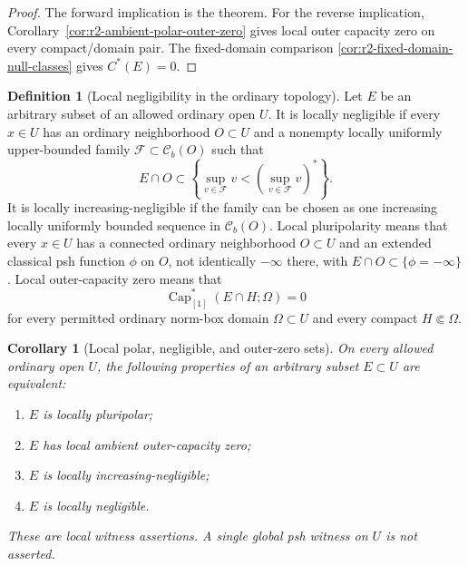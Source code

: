 \documentclass[11pt,a4paper]{article}
\numberwithin{equation}{section}
\newtheorem{corollary}[theorem]{Corollary}
\theoremstyle{definition}
\newtheorem{definition}[theorem]{Definition}
\theoremstyle{remark}
\newcommand{\Cb}{\mathcal C_b}
\begin{document}
\begin{proof}
The forward implication is the theorem. For the reverse implication,
Corollary~\ref{cor:r2-ambient-polar-outer-zero} gives local outer
capacity zero on every compact/domain pair. The fixed-domain
comparison \ref{cor:r2-fixed-domain-null-classes} gives $C^*(E)=0$.
\end{proof}

\begin{definition}[Local negligibility in the ordinary topology]
\label{def:r2-local-negligibility}
Let $E$ be an arbitrary subset of an allowed ordinary open $U$.
It is locally negligible if every $x\in U$ has an ordinary
neighborhood $O\subset U$ and a nonempty locally uniformly
upper-bounded family $\mathcal F\subset\Cb(O)$ such that
\[
 E\cap O\subset
 \left\{\sup_{v\in\mathcal F}v<
                    \left(\sup_{v\in\mathcal F}v\right)^*\right\}.
\]
It is locally increasing-negligible if the family can be chosen as
one increasing locally uniformly bounded sequence in $\Cb(O)$.
Local pluripolarity means that every $x\in U$ has a connected ordinary
neighborhood $O\subset U$ and an extended classical psh function
$\phi$ on $O$, not identically $-\infty$ there, with
$E\cap O\subset\{\phi=-\infty\}$.
Local outer-capacity zero means that
\[
 \operatorname{Cap}_{[1]}^*(E\cap H;\Omega)=0
\]
for every permitted ordinary norm-box domain $\Omega\subset U$
and every compact $H\Subset\Omega$.
\end{definition}

\begin{corollary}[Local polar, negligible, and outer-zero sets]
\label{cor:r2-polar-negligible-equivalence}
On every allowed ordinary open $U$, the following properties of an arbitrary subset
$E\subset U$ are equivalent:
\begin{enumerate}[label=\textup{(\roman*)}]
\item $E$ is locally pluripolar;
\item $E$ has local ambient outer-capacity zero;
\item $E$ is locally increasing-negligible;
\item $E$ is locally negligible.
\end{enumerate}
These are local witness assertions. A single global psh witness on
$U$ is not asserted.
\end{corollary}
\end{document}
